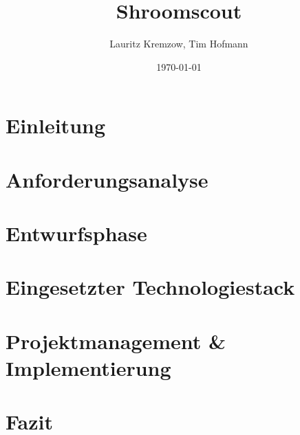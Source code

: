 \documentclass{article}
\title{Shroomscout}
\author{Lauritz Kremzow, Tim Hofmann}
\date{\today}
\begin{document}
\begin{titlepage}
    \maketitle
\end{titlepage}

\tableofcontents

\newpage

\section{Einleitung}


\section{Anforderungsanalyse}


\section{Entwurfsphase}


\section{Eingesetzter Technologiestack}


\section{Projektmanagement \& Implementierung}


\section{Fazit}

\end{document}
